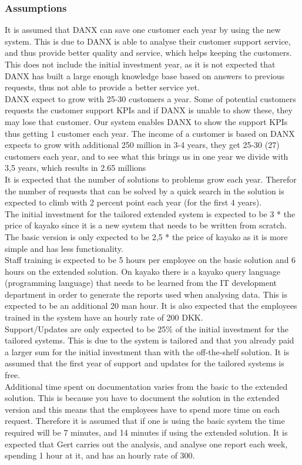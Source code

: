 \subsubsection{Assumptions}
\label{subsub:assumptions}
It is assumed that DANX can save one customer each year by using the new system. This is due to DANX is able to analyse their customer support service, and thus provide better quality and service, which helps keeping the customers. This does not include the initial investment year, as it is not expected that DANX has built a large enough knowledge base based on answers to previous requests, thus not able to provide a better service yet.\\
DANX expect to grow with 25-30 customers a year\cite{bob003}. Some of potential customers requests the customer support KPIs and if DANX is unable to show these, they may lose that customer. Our system enables DANX to show the support KPIs thus getting 1 customer each year. The income of a customer is based on DANX expects to grow with additional 250 million in 3-4 years, they get 25-30 (27) customers each year, and to see what this brings us in one year we divide with 3,5 years, which results in 2.65 millions\\
It is expected that the number of solutions to problems grow each year. Therefor the number of requests that can be solved by a quick search in the solution is expected to climb with 2 percent point each year (for the first 4 years). \\
The initial investment for the tailored extended system is expected to be 3 * the price of kayako since it is a new system that needs to be written from scratch. The basic version is only expected to be 2,5 * the price of kayako as it is more simple and has less functionality. \\
Staff training is expected to be 5 hours per employee on the basic solution and 6 hours on the extended solution. On kayako there is a kayako query\cite{webpage009} language (programming language) that needs to be learned from the IT development department in order to generate the reports used when analysing data. This is expected to be an additional 20 man hour.
It is also expected that the employees trained in the system have an hourly rate of 200 DKK.\\
Support/Updates are only expected to be 25\% of the initial investment for the tailored systems. This is due to the system is tailored and that you already paid a larger sum for the initial investment than with the off-the-shelf solution. It is assumed that the first year of support and updates for the tailored systems is free. \\
Additional time spent on documentation varies from the basic to the extended solution. This is because you have to document the solution in the extended version and this means that the employees have to spend more time on each request.
Therefore it is assumed that if one is using the basic system the time required will be 7 minutes, and 14 minutes if using the extended solution. 
It is expected that Gert carries out the analysis, and analyse one report each week, spending 1 hour at it, and has an hourly rate of 300. \\


